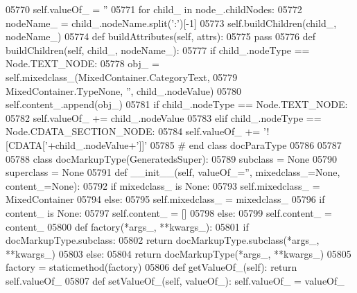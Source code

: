 \begin{DoxyCode}
{{{{{{{{{{{{{{{{{{{{{{{{{{{{{{{{{{{{{{{{{{{{{{{{{{{{{{{{{{{{{{{{{{{{{{{{{{{{{{{{{{{{{{{{{{{{{{{{{{{{{{{{{{{{{{{{{{{{{{{{{{{{{{{{{{{{{{{{{{{{{{{{{{{{{{{{{{{{{{{{{{{{{{{{{{{{{{{{{{{{{{{{{{{{{{{{{{{{{{{{{{{{{{{{{{{{{{{{{{{{{{{{{{{{{{{{{{{{{{{{{{{{{{{{{{{{{{{{{{{{{{{{{{{{{{{{{{{{{{{{{{{{{{{{{{{{{{{{{{{{{{{{{{{{{{{{{{{{{{{{{{{{{{{{{{{{{{{{{{{{{{{{{{{{{{{{{{{{05770         self.valueOf_ = \textcolor{stringliteral}{''}
05771         \textcolor{keywordflow}{for} child\_ \textcolor{keywordflow}{in} node\_.childNodes:
05772             nodeName\_ = child\_.nodeName.split(\textcolor{stringliteral}{':'})[-1]
05773             self.buildChildren(child\_, nodeName\_)
05774     \textcolor{keyword}{def }buildAttributes(self, attrs):
05775         \textcolor{keywordflow}{pass}
05776     \textcolor{keyword}{def }buildChildren(self, child\_, nodeName\_):
05777         \textcolor{keywordflow}{if} child\_.nodeType == Node.TEXT\_NODE:
05778             obj\_ = self.mixedclass\_(MixedContainer.CategoryText,
05779                 MixedContainer.TypeNone, \textcolor{stringliteral}{''}, child\_.nodeValue)
05780             self.content\_.append(obj\_)
05781         \textcolor{keywordflow}{if} child\_.nodeType == Node.TEXT\_NODE:
05782             self.valueOf\_ += child\_.nodeValue
05783         \textcolor{keywordflow}{elif} child\_.nodeType == Node.CDATA\_SECTION\_NODE:
05784             self.valueOf\_ += \textcolor{stringliteral}{'![CDATA['}+child\_.nodeValue+\textcolor{stringliteral}{']]'}
05785 \textcolor{comment}{# end class docParaType}
05786 
05787 
05788 \textcolor{keyword}{class }docMarkupType(GeneratedsSuper):
05789     subclass = \textcolor{keywordtype}{None}
05790     superclass = \textcolor{keywordtype}{None}
05791     \textcolor{keyword}{def }__init__(self, valueOf\_='', mixedclass\_=None, content\_=None):
05792         \textcolor{keywordflow}{if} mixedclass\_ \textcolor{keywordflow}{is} \textcolor{keywordtype}{None}:
05793             self.mixedclass_ = MixedContainer
05794         \textcolor{keywordflow}{else}:
05795             self.mixedclass_ = mixedclass\_
05796         \textcolor{keywordflow}{if} content\_ \textcolor{keywordflow}{is} \textcolor{keywordtype}{None}:
05797             self.content_ = []
05798         \textcolor{keywordflow}{else}:
05799             self.content_ = content\_
05800     \textcolor{keyword}{def }factory(*args\_, **kwargs\_):
05801         \textcolor{keywordflow}{if} docMarkupType.subclass:
05802             \textcolor{keywordflow}{return} docMarkupType.subclass(*args\_, **kwargs\_)
05803         \textcolor{keywordflow}{else}:
05804             \textcolor{keywordflow}{return} docMarkupType(*args\_, **kwargs\_)
05805     factory = staticmethod(factory)
05806     \textcolor{keyword}{def }getValueOf_(self): \textcolor{keywordflow}{return} self.valueOf\_
05807     \textcolor{keyword}{def }setValueOf_(self, valueOf\_): self.valueOf\_ = valueOf\_
}}}}}}}}}}}}}}}}}}}}}}}}}}}}}}}}}}}}}}}}}}}}}}}}}}}}}}}}}}}}}}}}}}}}}}}}}}}}}}}}}}}}}}}}}}}}}}}}}}}}}}}}}}}}}}}}}}}}}}}}}}}}}}}}}}}}}}}}}}}}}}}}}}}}}}}}}}}}}}}}}}}}}}}}}}}}}}}}}}}}}}}}}}}}}}}}}}}}}}}}}}}}}}}}}}}}}}}}}}}}}}}}}}}}}}}}}}}}}}}}}}}}}}}}}}}}}}}}}}}}}}}}}}}}}}}}}}}}}}}}}}}}}}}}}}}}}}}}}}}}}}}}}}}}}}}}}}}}}}}}}}}}}}}}}}}}}}}}}}}}}}}}}}}}}}}}}}}}
\end{DoxyCode}
